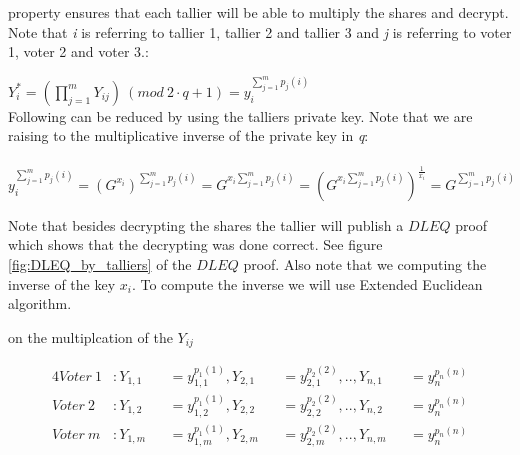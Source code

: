 \noindent
{} property ensures that each tallier will  be able to multiply the shares and decrypt. Note that \textit{i} is referring to tallier 1, tallier  2 and tallier 3 and \textit{j} is referring to voter 1, voter 2 and voter 3.:\\

\begin{infobox}
\begin{math}Y_i^*=(\prod\limits_{j=1}^{m} Y_{ij}) \ (mod\ 2 \cdot q+1) =y_i^{\sum\limits_{j=1}^m p_j(i)}\end{math}\\
Following can be reduced by using the talliers private key. Note that we are raising to the multiplicative inverse of the private key in  \textit{q}:\\\\
\begin{math}y_i^{\sum\limits_{j=1}^m p_j(i)}=(G^{x_i})^{\sum\limits_{j=1}^m p_j(i)} = G^{x_i \sum\limits_{j=1}^m p_j(i)}= (G^{x_i \sum\limits_{j=1}^m p_j(i)})^{\frac{1}{x_i}}= G^{ \sum\limits_{j=1}^m p_j(i)}   \end{math}
\end{infobox}


\noindent
Note that besides decrypting the shares the tallier will publish a $DLEQ$ proof which shows that the decrypting was done correct. See figure \ref{fig:DLEQ_by_talliers} of the $DLEQ$ proof. Also note that we computing the inverse of the key $x_i$. To compute the inverse we will use Extended Euclidean algorithm.

 on the multiplcation of the $Y_{ij}$

\begin{alignat*}{4}
Voter \ 1&: Y_{1,1}&&=y_{1,1}^{p_1(1)},Y_{2,1}&&=y_{2,1}^{p_2(2)} ,.., Y_{n,1}&&=y_n^{p_n(n)}\\
Voter \ 2&: Y_{1,2}&&=y_{1,2}^{p_1(1)},Y_{2,2}&&=y_{2,2}^{p_2(2)} ,.., Y_{n,2}&&=y_n^{p_n(n)}\\
Voter \ \textit{m}&: Y_{1,m}&&=y_{1,m}^{p_1(1)} , Y_{2,m}&&=y_{2,m}^{p_2(2)} ,.., Y_{n,m}&&=y_n^{p_n(n)}
\end{alignat*}






